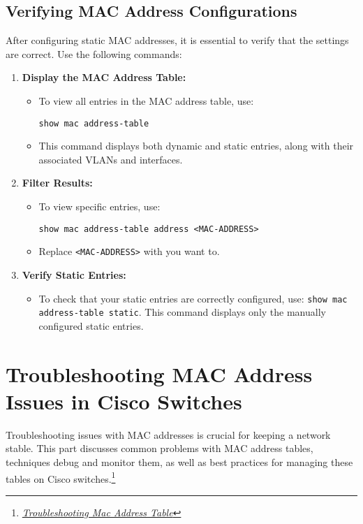 \documentclass[11pt,a4paper]{article}
\begin{document}
\subsection*{Verifying MAC Address Configurations}
After configuring static MAC addresses, it is essential to verify that the settings are correct. Use the following commands:

\begin{enumerate}
    \item \textbf{Display the MAC Address Table:}
        \begin{itemize}
            \item To view all entries in the MAC address table, use:
\begin{lstlisting}
show mac address-table
\end{lstlisting}
            \item This command displays both dynamic and static entries, along with their associated VLANs and interfaces.
        \end{itemize}
        
    \item \textbf{Filter Results:}
        \begin{itemize}
            \item To view specific entries, use:
\begin{lstlisting}
show mac address-table address <MAC-ADDRESS>
\end{lstlisting}
            \item Replace \lstinline{<MAC-ADDRESS>} with you want to.
        \end{itemize}

    \item \textbf{Verify Static Entries:}
        \begin{itemize}
            \item To check that your static entries are correctly configured, use: \lstinline{show mac address-table static}. This command displays only the manually configured static entries.            
        \end{itemize}
\end{enumerate}


\section*{Troubleshooting MAC Address Issues in Cisco Switches}

Troubleshooting issues with MAC addresses is crucial for keeping a network stable. This part discusses common problems with MAC address tables, techniques  debug and monitor them, as well as best practices for managing these tables on Cisco switches.\footnote{\href{https://www.cisco.com/c/fr_ca/support/docs/switches/catalyst-9300-series-switches/222060-troubleshoot-mac-address-table-manager-o.html?dtid=osscdc000283}{\textit{Troubleshooting Mac Address Table}}}
\end{document}
